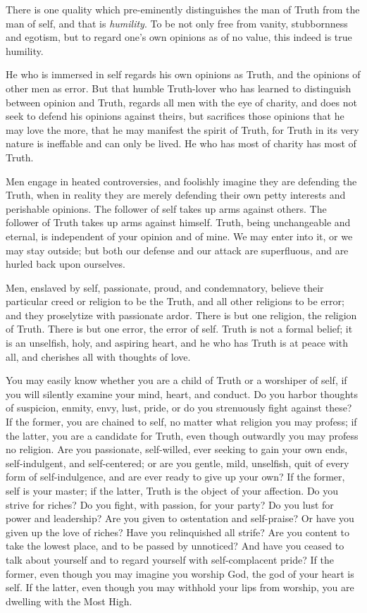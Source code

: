 \documentclass[12pt,oneside]{scrbook}
\begin{document}
  There is one quality which pre-eminently distinguishes the man of Truth
  from the man of self, and that is \emph{humility}. To be not only free
  from vanity, stubbornness and egotism, but to regard one's own opinions
  as of no value, this indeed is true humility.
  
  He who is immersed in self regards his own opinions as Truth, and the
  opinions of other men as error. But that humble Truth-lover who has
  learned to distinguish between opinion and Truth, regards all men with
  the eye of charity, and does not seek to defend his opinions against
  theirs, but sacrifices those opinions that he may love the more, that he
  may manifest the spirit of Truth, for Truth in its very nature is
  ineffable and can only be lived. He who has most of charity has most of
  Truth.
  
  Men engage in heated controversies, and foolishly imagine they are
  defending the Truth, when in reality they are merely defending their own
  petty interests and perishable opinions. The follower of self takes up
  arms against others. The follower of Truth takes up arms against
  himself. Truth, being unchangeable and eternal, is independent of your
  opinion and of mine. We may enter into it, or we may stay outside; but
  both our defense and our attack are superfluous, and are hurled back
  upon ourselves.
  
  Men, enslaved by self, passionate, proud, and condemnatory, believe
  their particular creed or religion to be the Truth, and all other
  religions to be error; and they proselytize with passionate ardor. There
  is but one religion, the religion of Truth. There is but one error, the
  error of self. Truth is not a formal belief; it is an unselfish, holy,
  and aspiring heart, and he who has Truth is at peace with all, and
  cherishes all with thoughts of love.
  
  You may easily know whether you are a child of Truth or a worshiper of
  self, if you will silently examine your mind, heart, and conduct. Do you
  harbor thoughts of suspicion, enmity, envy, lust, pride, or do you
  strenuously fight against these? If the former, you are chained to self,
  no matter what religion you may profess; if the latter, you are a
  candidate for Truth, even though outwardly you may profess no religion.
  Are you passionate, self-willed, ever seeking to gain your own ends,
  self-indulgent, and self-centered; or are you gentle, mild, unselfish,
  quit of every form of self-indulgence, and are ever ready to give up
  your own? If the former, self is your master; if the latter, Truth is
  the object of your affection. Do you strive for riches? Do you fight,
  with passion, for your party? Do you lust for power and leadership? Are
  you given to ostentation and self-praise? Or have you given up the love
  of riches? Have you relinquished all strife? Are you content to take the
  lowest place, and to be passed by unnoticed? And have you ceased to talk
  about yourself and to regard yourself with self-complacent pride? If the
  former, even though you may imagine you worship God, the god of your
  heart is self. If the latter, even though you may withhold your lips
  from worship, you are dwelling with the Most High.
  
\end{document}
